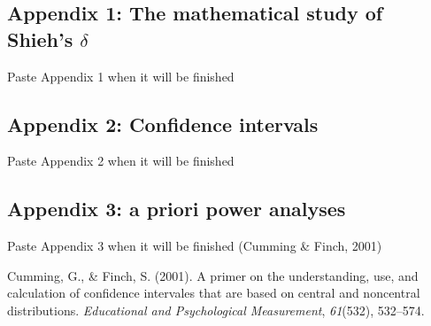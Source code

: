 \documentclass[
  man,floatsintext]{apa6}
\begin{document}
\begin{appendix}
\section{}
\setlength{\parindent}{0.0in}
\setlength{\leftskip}{0.0in}

\hypertarget{appendix-1-the-mathematical-study-of-shiehs-delta}{%
\subsection{\texorpdfstring{Appendix 1: The mathematical study of
Shieh's
\(\delta\)}{Appendix 1: The mathematical study of Shieh's \textbackslash delta}}\label{appendix-1-the-mathematical-study-of-shiehs-delta}}

Paste Appendix 1 when it will be finished

\hypertarget{appendix-2-confidence-intervals}{%
\subsection{Appendix 2: Confidence
intervals}\label{appendix-2-confidence-intervals}}

Paste Appendix 2 when it will be finished

\hypertarget{appendix-3-a-priori-power-analyses}{%
\subsection{Appendix 3: a priori power
analyses}\label{appendix-3-a-priori-power-analyses}}

Paste Appendix 3 when it will be finished (Cumming \& Finch, 2001)

\hypertarget{refs}{}
\leavevmode\hypertarget{ref-Cumming_Finch_2001}{}%
Cumming, G., \& Finch, S. (2001). A primer on the understanding, use,
and calculation of confidence intervales that are based on central and
noncentral distributions. \emph{Educational and Psychological
Measurement}, \emph{61}(532), 532--574.
\end{appendix}
\end{document}
